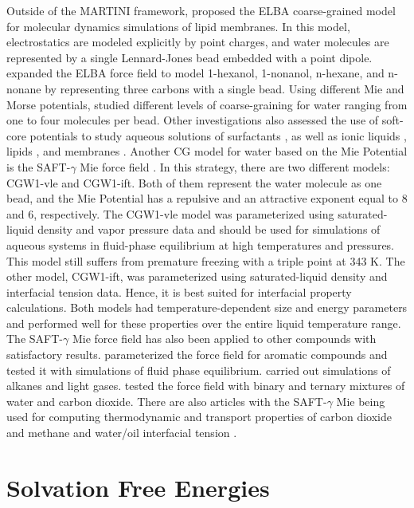 Outside of the MARTINI framework,  proposed the ELBA coarse-grained model for molecular dynamics simulations of lipid membranes. In this model, electrostatics are modeled explicitly by point charges, and water molecules are represented by a single Lennard-Jones bead embedded with a point dipole.  expanded the ELBA force field to model 1-hexanol, 1-nonanol, n-hexane, and n-nonane by representing three carbons with a single bead. Using different Mie and Morse potentials,  studied different levels of coarse-graining for water ranging from one to four molecules per bead. Other investigations also assessed the use of soft-core potentials to study aqueous solutions of surfactants \cite{shinoda2007}, as well as ionic liquids \cite{bhargava2009}, lipids \cite{shinoda20102}, and membranes \cite{pantano2009}. Another CG model for water based on the Mie Potential is the SAFT-$\gamma$ Mie force field \cite{lobanova2015}. In this strategy, there are two different models: CGW1-vle and CGW1-ift. Both of them represent the water molecule as one bead, and the Mie Potential has a repulsive and an attractive exponent equal to 8 and 6, respectively. The CGW1-vle model was parameterized using saturated-liquid density and vapor pressure data and should be used for simulations of aqueous systems in fluid-phase equilibrium at high temperatures and pressures. This model still suffers from premature freezing with a triple point at 343 K. The other model, CGW1-ift, was parameterized using saturated-liquid density and interfacial tension data. Hence, it is best suited for interfacial property calculations. Both models had temperature-dependent size and energy parameters and performed well for these properties over the entire liquid temperature range. The SAFT-$\gamma$ Mie force field has also been applied to other compounds with satisfactory results.  parameterized the force field for aromatic compounds and tested it with simulations of fluid phase equilibrium.  carried out simulations of alkanes and light gases.  tested the force field with binary and ternary mixtures of water and carbon dioxide. There are also articles with the SAFT-$\gamma$ Mie being used for computing thermodynamic and transport properties of carbon dioxide and methane \cite{cassiano1,cassiano2} and water/oil interfacial tension \cite{herdes2017}.  

\section{Solvation Free Energies}


